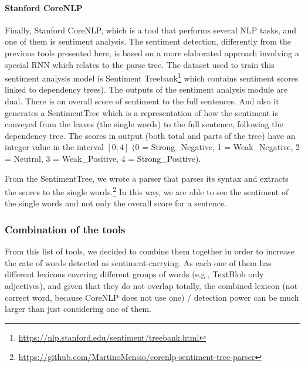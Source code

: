 \paragraph{Stanford CoreNLP}
Finally, Stanford CoreNLP, which is a tool that performs several NLP tasks, and one of them is sentiment analysis. The sentiment detection, differently from the previous tools presented here, is based on a more elaborated approach involving a special RNN which relates to the parse tree. 
The dataset used to train this sentiment analysis model is Sentiment Treebank\footnote{\url{https://nlp.stanford.edu/sentiment/treebank.html}} which contains sentiment scores linked to dependency trees).
The outputs of the sentiment analysis module are dual. There is an overall score of sentiment to the full sentences. And also it generates a SentimentTree which is a representation of how the sentiment is conveyed from the leaves (the single words) to the full sentence, following the dependency tree.
The scores in output (both total and parts of the tree) have an integer value in the interval $[0;4]$ (0 = Strong\_Negative, 1 = Weak\_Negative, 2 = Neutral, 3 = Weak\_Positive, 4 = Strong\_Positive).

From the SentimentTree, we wrote a parser that parses its syntax and extracts the scores to the single words.\footnote{\url{https://github.com/MartinoMensio/corenlp-sentiment-tree-parser}}
In this way, we are able to see the sentiment of the single words and not only the overall score for a sentence.

\subsubsection{\statusgreen Combination of the tools}
From this list of tools, we decided to combine them together in order to increase the rate of words detected as sentiment-carrying. As each one of them has different lexicons covering different groups of words (e.g., TextBlob only adjectives), and given that they do not overlap totally, the combined lexicon (not correct word, because CoreNLP does not use one) / detection power can be much larger than just considering one of them.

